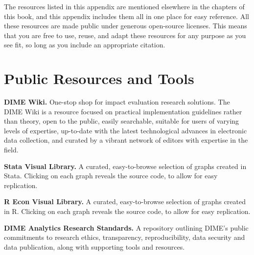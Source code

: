 
\newcommand{\resourcepar}{\vspace{.75\baselineskip}\noindent}


\begin{fullwidth}

The resources listed in this appendix
are mentioned elsewhere in the chapters of this book,
and this appendix includes them all
in one place for easy reference.
All these resources are made public
under generous open-source licenses.
This means that you are free to use, reuse, and adapt these resources
for any purpose as you see fit,
so long as you include an appropriate citation.

\end{fullwidth}


\section{Public Resources and Tools}

\textbf{DIME Wiki.}
One-stop shop for impact evaluation research solutions.
The DIME Wiki is a resource focused on
practical implementation guidelines rather than theory,
open to the public, easily searchable,
suitable for users of varying levels of expertise,
up-to-date with the latest technological advances
in electronic data collection,
and curated by a vibrant network of editors
with expertise in the field.

\resourcepar\textbf{Stata Visual Library.}
A curated, easy-to-browse selection of graphs created in Stata.
Clicking on each graph reveals the source code,
to allow for easy replication.

\resourcepar\textbf{R Econ Visual Library.}
A curated, easy-to-browse selection of graphs created in R.
Clicking on each graph reveals the source code,
to allow for easy replication.

\resourcepar\textbf{DIME Analytics Research Standards.}
A repository outlining DIME's public commitments to
research ethics, transparency, reproducibility,
data security and data publication,
along with supporting tools and resources.

